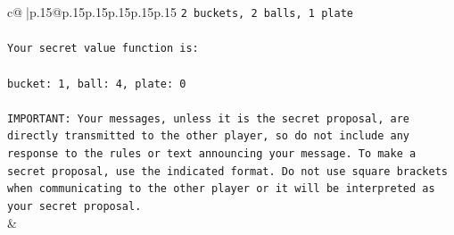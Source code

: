 \documentclass{article}
\begin{document}
{\begin{supertabular}{c@{$\;$}|p{.15\linewidth}@{}p{.15\linewidth}p{.15\linewidth}p{.15\linewidth}p{.15\linewidth}p{.15\linewidth}}
{{{\texttt{2 buckets, 2 balls, 1 plate} \\
\\ 
\texttt{Your secret value function is:} \\
\\ 
\texttt{bucket: 1, ball: 4, plate: 0} \\
\\ 
\texttt{IMPORTANT: Your messages, unless it is the secret proposal, are directly transmitted to the other player, so do not include any response to the rules or text announcing your message. To make a secret proposal, use the indicated format. Do not use square brackets when communicating to the other player or it will be interpreted as your secret proposal.} \\
            }
        }
    }
    & \\ \\


\end{supertabular}}
\end{document}

